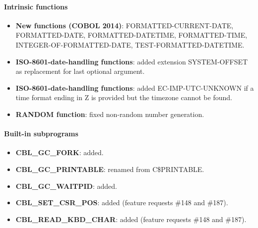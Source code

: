 \paragraph{Intrinsic functions}
\begin{itemize}
\item \textbf{New functions (COBOL 2014)}: FORMATTED-CURRENT-DATE, FORMATTED-DATE, FORMATTED-DATETIME, FORMATTED-TIME, INTEGER-OF-FORMATTED-DATE, TEST-FORMATTED-DATETIME.
\item \textbf{ISO-8601-date-handling functions}: added extension SYSTEM-OFFSET as replacement for last optional argument.
\item \textbf{ISO-8601-date-handling functions}: added EC-IMP-UTC-UNKNOWN if a time format ending in Z is provided but the timezone cannot be found.
\item \textbf{RANDOM function}: fixed non-random number generation.
\end{itemize}

\paragraph{Built-in subprograms}
\begin{itemize}
\item \textbf{CBL\_GC\_FORK}: added.
\item \textbf{CBL\_GC\_PRINTABLE}: renamed from C\$PRINTABLE.
\item \textbf{CBL\_GC\_WAITPID}: added.
\item \textbf{CBL\_SET\_CSR\_POS}: added (feature requests \#148 and \#187).
\item \textbf{CBL\_READ\_KBD\_CHAR}: added (feature requests \#148 and \#187).
\end{itemize}

